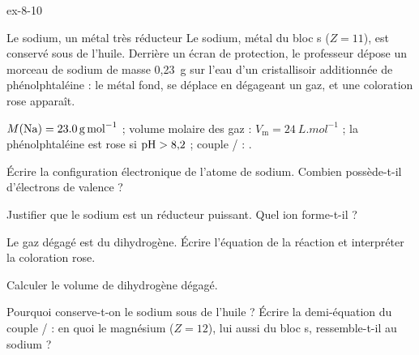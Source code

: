 \begin{blocLivre}{ex-8-10}
\begin{exercice}[2]{Le sodium, un métal très réducteur}
Le sodium, métal du bloc s ($Z=11$), est conservé sous de l'huile. Derrière un écran de protection, le professeur dépose
un morceau de sodium de masse 0,23~g sur l'eau d'un cristallisoir additionnée de phénolphtaléine : le métal fond, se
déplace en dégageant un gaz, et une coloration rose apparaît.
\begin{donnees}
$M(\ce{Na})=\qty{23,0}{g.mol^{-1}}$ ; volume molaire des gaz : $V_\mathrm{m}=\qty{24}{L.mol^{-1}}$ ; la phénolphtaléine est
rose si $\mathrm{pH}>8{,}2$ ; couple / : .
\end{donnees}
\begin{questions}
\item Écrire la configuration électronique de l'atome de sodium. Combien possède-t-il d'électrons de valence ?
\item Justifier que le sodium est un réducteur puissant. Quel ion forme-t-il ?
\item Le gaz dégagé est du dihydrogène. Écrire l'équation de la réaction et interpréter la coloration rose.
\item Calculer le volume de dihydrogène dégagé.
\item Pourquoi conserve-t-on le sodium sous de l'huile ? Écrire la demi-équation du couple / : en quoi le
magnésium ($Z=12$), lui aussi du bloc s, ressemble-t-il au sodium ?
\end{questions}
\end{exercice}
\end{blocLivre}
